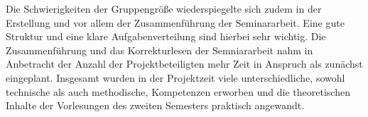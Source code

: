 	Die Schwierigkeiten der Gruppengröße wiederspiegelte sich zudem in der Erstellung und vor allem der Zusammenführung der Seminararbeit. Eine gute Struktur und eine klare Aufgabenverteilung sind hierbei sehr wichtig. Die Zusammenführung und das Korrekturlesen der Semniararbeit nahm in Anbetracht der Anzahl der Projektbeteiligten mehr Zeit in Anspruch als zunächst eingeplant.
	Insgesamt wurden in der Projektzeit viele unterschiedliche, sowohl technische als auch methodische, Kompetenzen erworben und die theoretischen Inhalte der Vorlesungen des zweiten Semesters praktisch angewandt.
	
	
	
	